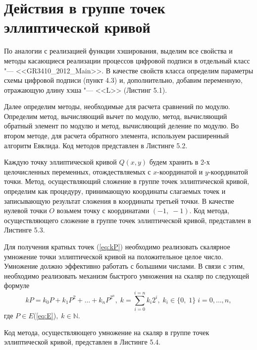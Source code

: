 \section{Действия в группе точек эллиптической кривой}
\par
По аналогии с реализацией функции хэширования, выделим все свойства и методы касающиеся реализации процессов цифровой подписи в отдельный класс "--- <<GR3410\_2012\_Main>>. В качестве свойств класса определим параметры схемы цифровой подписи (пункт 4.3) и, дополнительно, добавим переменную, отражающую длину хэша "--- <<L>> (Листинг 5.1).

\par
Далее определим методы, необходимые для расчета сравнений по модулю. Определим метод, вычисляющий вычет по модулю, метод, вычисляющий обратный элемент по модулю и метод, вычисляющий деление по модулю. Во втором методе, для расчета обратного элемента, используем расширенный алгоритм Евклида. Код методов представлен в Листинге 5.2.

\par
Каждую точку эллиптической кривой $Q(x,y)$ будем хранить в 2-х целочисленных переменных, отождествляемых с $x$-координатой и $y$-координатой точки. Метод, осуществляющий сложение в группе точек эллиптической кривой, определим как процедуру, принимающую координаты слагаемых точек и записывающую результат сложения в координаты третьей точки. В качестве нулевой точки $O$ возьмем точку с координатами $(-1,\;-1)$. Код метода, осуществляющего сложение в группе точек эллиптической кривой, представлен в Листинге 5.3.

\par
Для получения кратных точек (\ref{eq:kP}) необходимо реализовать скалярное умножение точки эллиптической кривой на положительное целое число. Умножение должно эффективно работать с большими числами. В связи с этим, необходимо реализовать механизм быстрого умножения на скаляр по следующей формуле
\begin{equation}
kP = k_0 P + k_1 P^2 + \dots + k_n P^{2^n},\;k = \sum_{i=0}^{i=n}k_i2^i,\;k_i\in\{0,\;1\}\; i=0,\dots,n,
\end{equation} 
где $P\in E$(\ref{eq:E})$,\; k \in \mathbb{N}$.
\par
Код метода, осуществляющего умножение на скаляр в группе точек эллиптической кривой, представлен в Листинге 5.4.

